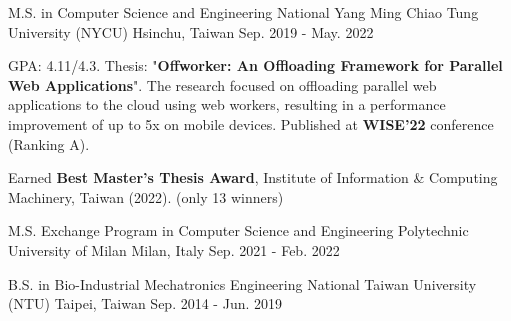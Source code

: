 
\vspace{-2mm}

\begin{cventries}

  
\cventry
  {M.S. in Computer Science and Engineering} %
  {National Yang Ming Chiao Tung University (NYCU)} %
  {Hsinchu, Taiwan} %
  {Sep. 2019 - May. 2022} %
  {
    \begin{cvitems} %
      \item {GPA: 4.11/4.3. Thesis: "\textbf{Offworker: An Offloading Framework for Parallel Web Applications}".
      The research focused on offloading parallel web applications to the cloud using web workers,
      resulting in a performance improvement of up to 5x on mobile devices. Published at \textbf{WISE'22} conference (Ranking A).
      }
      \item {Earned \textbf{Best Master's Thesis Award}, Institute of Information \& Computing Machinery, Taiwan (2022). (only 13 winners)}
    \end{cvitems}
  }

  \vspace{-3mm}

\cventry
    {M.S. Exchange Program in Computer Science and Engineering} %
    {Polytechnic University of Milan} %
    {Milan, Italy} %
    {Sep. 2021 - Feb. 2022} %
    {}

  \vspace{-10mm}

\cventry
    {B.S. in Bio-Industrial Mechatronics Engineering} %
    {National Taiwan University (NTU)} %
    {Taipei, Taiwan} %
    {Sep. 2014 - Jun. 2019} %
    {
    }

  \vspace{-10mm}

\end{cventries}

